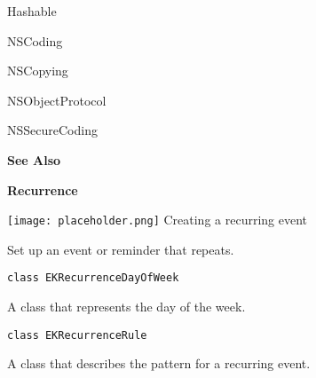\documentclass{article}
\begin{document}
Hashable

NSCoding

NSCopying

NSObjectProtocol

NSSecureCoding

\textbf{See Also}

\textbf{Recurrence}

\texttt{[image: placeholder.png]} Creating a recurring event

Set up an event or reminder that repeats.

\texttt{class EKRecurrenceDayOfWeek}

A class that represents the day of the week.

\texttt{class EKRecurrenceRule}

A class that describes the pattern for a recurring event.

\newpage
\end{document}
